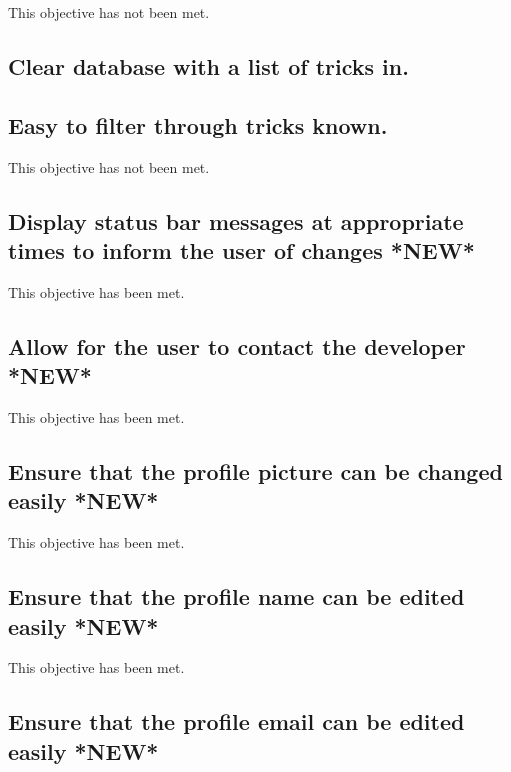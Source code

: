 This objective has not been met.



\subsection{Clear database with a list of tricks in.} %




\subsection{ Easy to filter through tricks known.}

This objective has not been met.



\subsection {Display status bar messages at appropriate times to inform the user of changes *NEW*}

This objective has been met.



\subsection {Allow for the user to contact the developer *NEW*}

This objective has been met.



\subsection {Ensure that the profile picture can be changed easily *NEW*} %

This objective has been met.



\subsection {Ensure that the profile name can be edited easily *NEW*} %

This objective has been met.




\subsection {Ensure that the profile email can be edited easily *NEW*} %

